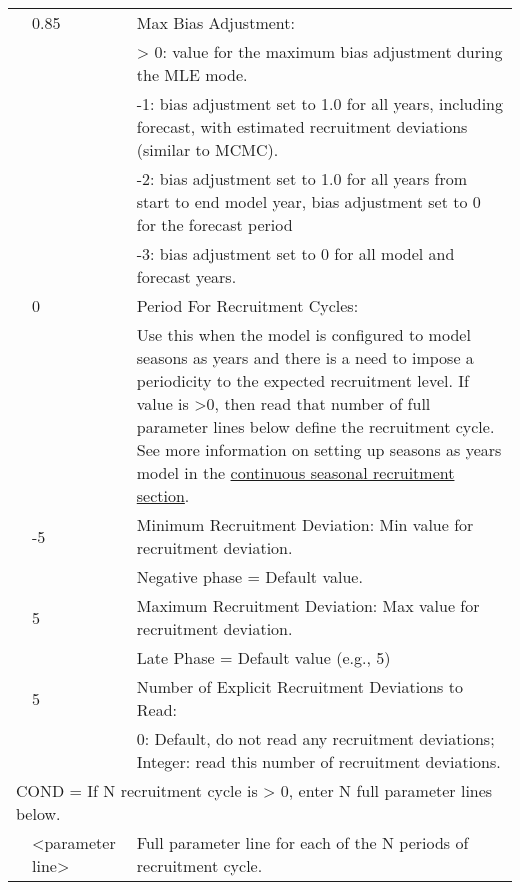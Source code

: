 \begin{longtable}{p{1cm} p{3cm} p{12cm}}
	\Tstrut & 0.85 & Max Bias Adjustment: \\
			&	   & > 0: value for the maximum bias adjustment during the MLE mode. \\
			& 	   & -1: bias adjustment set to 1.0 for all years, including forecast, with estimated recruitment deviations (similar to MCMC). \\
			& 	   & -2: bias adjustment set to 1.0 for all years from start to end model year, bias adjustment set to 0 for the forecast period \\
			& 	   & -3: bias adjustment set to 0 for all model and forecast years. \\

	\Tstrut & 0    & Period For Recruitment Cycles: \\
			&      & Use this when the model is configured to model seasons as years and there is a need to impose a periodicity to the expected recruitment level. If value is >0, then read that number of full parameter lines below define the recruitment cycle. See more information on setting up seasons as years model in the \hyperlink{continuous-seasonal-recruitment-sec}{continuous seasonal recruitment section}. \\
	
	\Tstrut & -5   & Minimum Recruitment Deviation: Min value for recruitment deviation. \\
			&	   & Negative phase = Default value. \\

	\Tstrut & 5	   & Maximum Recruitment Deviation: Max value for recruitment deviation. \\
			&	   & Late Phase = Default value (e.g., 5) \\
	
	\Tstrut & 5   & Number of Explicit Recruitment Deviations to Read: \\
			&      & 0: Default, do not read any recruitment deviations; Integer: read this number of recruitment deviations. \\

	\multicolumn{3}{l}{COND = If N recruitment cycle is > 0, enter N full parameter lines below.} \Tstrut\\
	\Tstrut & <parameter line> & Full parameter line for each of the N periods of recruitment cycle. \Bstrut\\
	\hline


\end{longtable}
